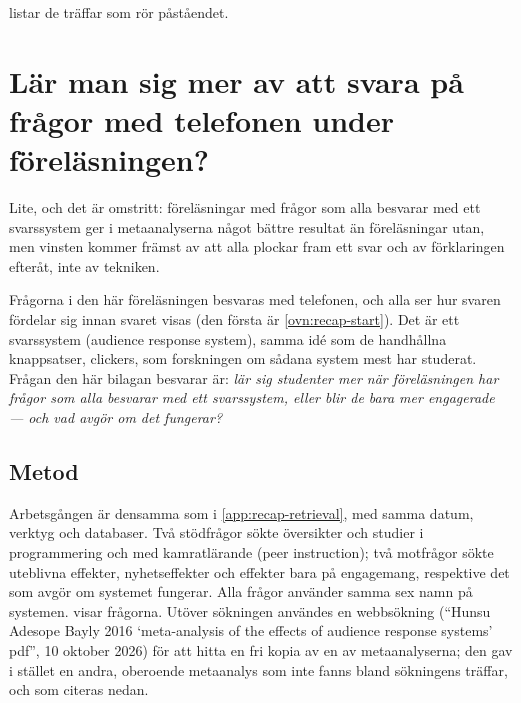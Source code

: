  listar de träffar som rör påståendet.




\chapter{Lär man sig mer av att svara på frågor med telefonen under
  föreläsningen?}
\label{app:recap-polls}

Lite, och det är omstritt: föreläsningar med frågor som alla besvarar med
ett svarssystem ger i metaanalyserna något bättre resultat än
föreläsningar utan, men vinsten kommer främst av att alla plockar fram
ett svar och av förklaringen efteråt, inte av tekniken.

Frågorna i den här föreläsningen besvaras med telefonen, och alla ser
hur svaren fördelar sig innan svaret visas (den första är
\cref{ovn:recap-start}).  Det är ett svarssystem
(\foreignlanguage{english}{audience response system}), samma idé som de
handhållna knappsatser, \foreignlanguage{english}{clickers}, som
forskningen om sådana system mest har studerat\autocite{Hunsu2016Clickers}.
Frågan den här bilagan besvarar är: \emph{lär sig studenter mer när
föreläsningen har frågor som alla besvarar med ett svarssystem, eller
blir de bara mer engagerade --- och vad avgör om det fungerar?}

\section{Metod}
\label{sec:recap-polls-metod}

Arbetsgången är densamma som i \cref{app:recap-retrieval}, med samma
datum, verktyg och databaser.  Två stödfrågor sökte översikter och
studier i programmering och med kamratlärande
(\foreignlanguage{english}{peer instruction}); två motfrågor sökte
uteblivna effekter, nyhetseffekter och effekter bara på engagemang,
respektive det som avgör om systemet fungerar.  Alla frågor använder
samma sex namn på systemen.   visar
frågorna.  Utöver sökningen användes en webbsökning
(\enquote{\foreignlanguage{english}{Hunsu Adesope Bayly 2016
\enquote{meta-analysis of the effects of audience response systems}
pdf}}, 10 oktober 2026) för att hitta en fri kopia av en av
metaanalyserna; den gav i stället en andra, oberoende metaanalys som
inte fanns bland sökningens träffar, och som citeras nedan.

